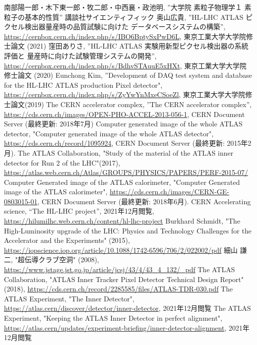 \begin{thebibliography}{24}
南部陽一郎・木下東一郎・牧二郎・中西襄・政池明,
”大学院 素粒子物理学１ 素粒子の基本的性質”
講談社サイエンティフィック
奥山広貴, ”HL-LHC ATLAS ピクセル検出器量産時の品質試験に向けた データベースシステムの構築”,
\url{https://cernbox.cern.ch/index.php/s/IBO6BptySxPwD6L}, 東京工業大学大学院修士論文 (2021)
窪田ありさ, ”HL-LHC ATLAS 実験用新型ピクセル検出器の系統評価と 量産時に向けた試験管理システムの開発”,
\url{https://cernbox.cern.ch/index.php/s/BdhvSTAuuE5xHXt}, 東京工業大学大学院修士論文 (2020)
Eunchong Kim, ”Development of DAQ test system and database for the HL-LHC ATLAS production Pixel detector",
\url{https://cernbox.cern.ch/index.php/s/ZyYwYnMxeCSoeZl}, 東京工業大学大学院修士論文(2019)
The CERN accelerator complex, ”The CERN accelerator complex”, \url{https://cds.cern.ch/images/OPEN-PHO-ACCEL-2013-056-1}, CERN Document Server (最終更新: 2018年7月)
Computer generated image of the whole ATLAS detector, "Computer generated image of the whole ATLAS detector", \url{https://cds.cern.ch/record/1095924}, CERN Document Server (最終更新: 2015年2月).
The ATLAS Collaboration, "Study of the material of the ATLAS inner detector for Run 2 of the LHC"(2017), \url{https://atlas.web.cern.ch/Atlas/GROUPS/PHYSICS/PAPERS/PERF-2015-07/}
Computer Generated image of the ATLAS calorimeter, "Computer Generated image of the ATLAS calorimeter", \url{https://cds.cern.ch/images/CERN-GE-0803015-01}, CERN Document Server (最終更新: 2018年6月).
CERN Accelerating science, “The HL-LHC project”, 2021年12月閲覧,
\url{https://hilumilhc.web.cern.ch/content/hl-lhc-project}
Burkhard Schmidt, "The High-Luminosity upgrade of the LHC: Physics and Technology Challenges for the Accelerator and the Experiments" (2015),
\url{https://iopscience.iop.org/article/10.1088/1742-6596/706/2/022002/pdf}
細山 謙二, "超伝導クラブ空洞" (2008), \url{https://www.jstage.jst.go.jp/article/jcsj/43/4/43_4_132/_pdf}
The ATLAS Collaboration, "ATLAS Inner Tracker Pixel Detector Technical Design Report" (2018), \url{https://cds.cern.ch/record/2285585/files/ATLAS-TDR-030.pdf}
The ATLAS Experiment, "The Inner Detector", \url{https://atlas.cern/discover/detector/inner-detector}, 2021年12月閲覧
The ATLAS Experiment, "Keeping the ATLAS Inner Detector in perfect alignment", \url{https://atlas.cern/updates/experiment-briefing/inner-detector-alignment}, 2021年12月閲覧

\end{thebibliography}
